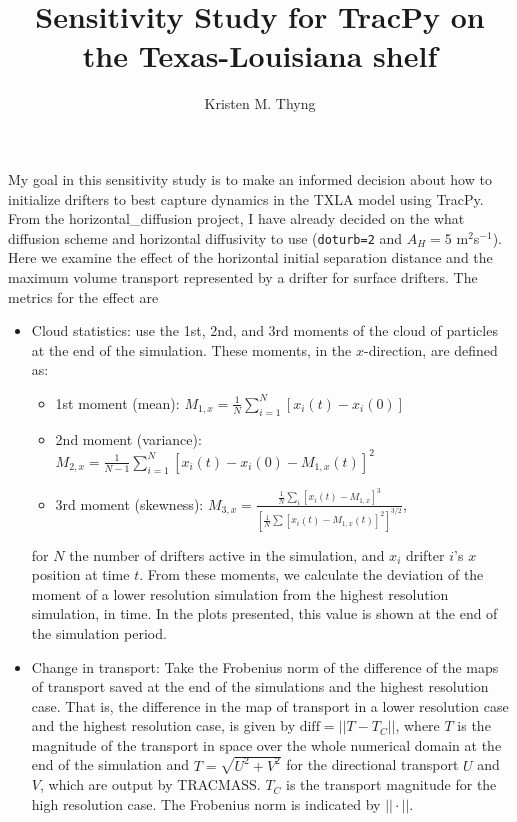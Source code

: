 \documentclass[11pt]{article}
\title{Sensitivity Study for TracPy on the Texas-Louisiana shelf}
\author{Kristen M. Thyng}
\begin{document}
% 
\maketitle




My goal in this sensitivity study is to make an informed decision about how to initialize drifters to best capture dynamics in the TXLA model using TracPy. From the horizontal\_diffusion project, I have already decided on the what diffusion scheme and horizontal diffusivity to use (\verb+doturb=2+ and $A_H=5$ m$^2$s$^{-1}$). Here we examine the effect of the horizontal initial separation distance and the maximum volume transport represented by a drifter for surface drifters. The metrics for the effect are
\begin{itemize}
	\item Cloud statistics: use the 1st, 2nd, and 3rd moments of the cloud of particles at the end of the simulation. These moments, in the $x$-direction, are defined as:
	\begin{itemize}
		\item 1st moment (mean): $M_{1,x} = \frac{1}{N}\sum^{N}_{i=1} \left[x_i(t) - x_i(0)\right]$
		\item 2nd moment (variance): $M_{2,x} = \frac{1}{N-1}\sum^{N}_{i=1} \left[ x_i(t) - x_i(0) - M_{1,x}(t)\right]^2$
		\item 3rd moment (skewness): $M_{3,x} = \frac{ \frac{1}{N}\sum_i \left[ x_i(t) - M_{1,x} \right]^3}{\left[ \frac{1}{N} \sum \left[x_i(t)-M_{1,x}(t)\right]^2\right]^{3/2}}$,
	\end{itemize}
	for $N$ the number of drifters active in the simulation, and $x_i$ drifter $i$'s $x$ position at time $t$. From these moments, we calculate the deviation of the moment of a lower resolution simulation from the highest resolution simulation, in time. In the plots presented, this value is shown at the end of the simulation period.

	\item Change in transport: Take the Frobenius norm of the difference of the maps of transport saved at the end of the simulations and the highest resolution case. That is, the difference in the map of transport in a lower resolution case and the highest resolution case, is given by $\text{diff} = ||T-T_C||$, where $T$ is the magnitude of the transport in space over the whole numerical domain at the end of the simulation and $T=\sqrt{U^2+V^2}$ for the directional transport $U$ and $V$, which are output by TRACMASS. $T_C$ is the transport magnitude for the high resolution case. The Frobenius norm is indicated by $||\cdot||$.
\end{itemize}
\end{document}
